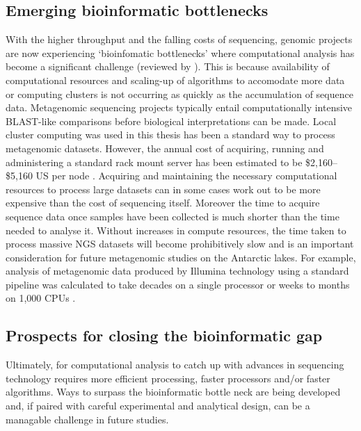 \subsection{Emerging bioinformatic bottlenecks}
With the higher throughput and the falling costs of sequencing, genomic projects are now experiencing `bioinfomatic bottlenecks' where computational analysis has become a significant challenge (reviewed by \citet{Scholz2012}).
This is because availability of computational resources and scaling-up of algorithms to accomodate more data or computing clusters is not occurring as quickly as the accumulation of sequence data.
Metagenomic sequencing projects typically entail computationally intensive \acs{BLAST}-like comparisons before biological interpretations can be made.
Local cluster computing was used in this thesis has been a standard way to process metagenomic datasets.
However, the annual cost of acquiring, running and administering a standard rack mount server has been estimated to be \$2,160--\$5,160 US per node \cite{Wilkening2009}.
Acquiring and maintaining the necessary computational resources to process large datasets can in some cases work out to be more expensive than the cost of sequencing itself.
Moreover the time to acquire sequence data once samples have been collected is much shorter than the time needed to analyse it.
Without increases in compute resources, the time taken to process massive \ac{NGS} datasets will become prohibitively slow and is an important consideration for future metagenomic studies on the Antarctic lakes.
For example, analysis of metagenomic data produced by Illumina technology using a standard pipeline was calculated to take decades on a single processor or weeks to months on 1,000 \acs{CPU}s \cite{Evanko2009}.

\subsection{Prospects for closing the bioinformatic gap}
Ultimately, for computational analysis to catch up with advances in sequencing technology requires more efficient processing, faster processors and/or faster algorithms.
Ways to surpass the bioinformatic bottle neck are being developed and, if paired with careful experimental and analytical design, can be a managable challenge in future studies.

